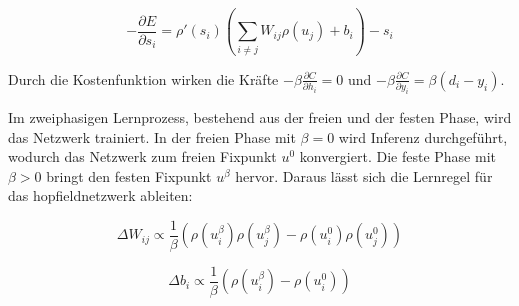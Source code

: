 \[-\frac{\partial E}{\partial s_i}=\rho'(s_i)\left(\sum_{i\neq{j}}W_{ij}\rho(u_j)+b_i\right)-s_i\]

Durch die Kostenfunktion wirken die Kräfte \(-\beta\frac{\partial C}{\partial h_i}=0\) und \(-\beta\frac{\partial C}{\partial y_i}=\beta(d_i-y_i)\).

Im zweiphasigen Lernprozess, bestehend aus der freien und der festen Phase, wird das Netzwerk trainiert. In der freien Phase mit \(\beta=0\) wird Inferenz durchgeführt, wodurch das Netzwerk zum freien Fixpunkt \(u^0\) konvergiert. Die feste Phase mit \(\beta>0\) bringt den festen Fixpunkt \(u^\beta\) hervor. Daraus lässt sich die Lernregel für das \gls{hopfieldnetzwerk} ableiten:

\[\Delta W_{ij}\propto\frac{1}{\beta}\left(\rho(u_i^\beta)\rho(u_j^\beta)-\rho(u_i^0)\rho(u_j^0)\right)\]

\[\Delta b_i\propto\frac{1}{\beta}\left(\rho(u_i^\beta)-\rho(u_i^0)\right)\]

